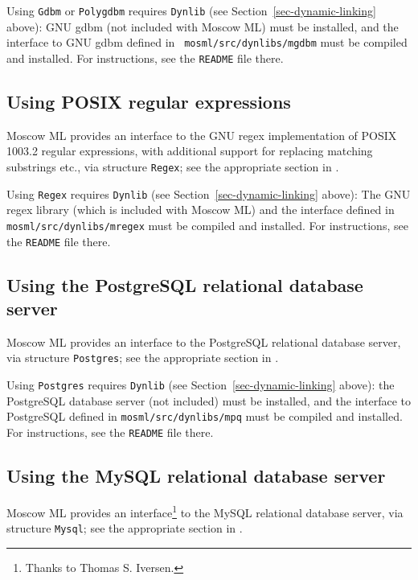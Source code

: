 \documentclass[fleqn,a4paper]{article}
\begin{document}
Using \texttt{Gdbm} or \texttt{Polygdbm} requires {\tt Dynlib} (see
Section~\ref{sec-dynamic-linking} above): GNU gdbm (not included with Moscow
ML) must be installed, and the interface to GNU gdbm defined in {\tt
  mosml/src/dynlibs/mgdbm} must be compiled and installed.  For
instructions, see the {\tt README} file there.


\subsection{Using POSIX regular expressions}
\label{sec-using-mregex}

Moscow ML provides an interface to the GNU regex implementation of
POSIX 1003.2 regular expressions, with additional support for
replacing matching substrings etc., via structure {\tt Regex}; see the
appropriate section in \cite{MoscowML:2000:MoscowMLLibrary}.

Using \texttt{Regex} requires {\tt Dynlib} (see
Section~\ref{sec-dynamic-linking} above): The GNU regex library (which is
included with Moscow ML) and the interface defined in {\tt
  mosml/src/dynlibs/mregex} must be compiled and installed.  For
instructions, see the {\tt README} file there.


\subsection{Using the PostgreSQL relational database server}
\label{sec-using-mpq}

Moscow ML provides an interface to the PostgreSQL relational database
server, via structure {\tt Postgres}; see the appropriate section in
\cite{MoscowML:2000:MoscowMLLibrary}.

Using \texttt{Postgres} requires {\tt Dynlib} (see
Section~\ref{sec-dynamic-linking} above): the PostgreSQL database server
(not included) must be installed, and the interface to PostgreSQL
defined in {\tt mosml/src/dynlibs/mpq} must be compiled and installed.
For instructions, see the {\tt README} file there.


\subsection{Using the MySQL relational database server}
\label{sec-using-mmysql}

Moscow ML provides an interface\footnote{Thanks to Thomas S.
  Iversen.} to the MySQL relational database server, via structure
{\tt Mysql}; see the appropriate section in
\cite{MoscowML:2000:MoscowMLLibrary}.
\end{document}
